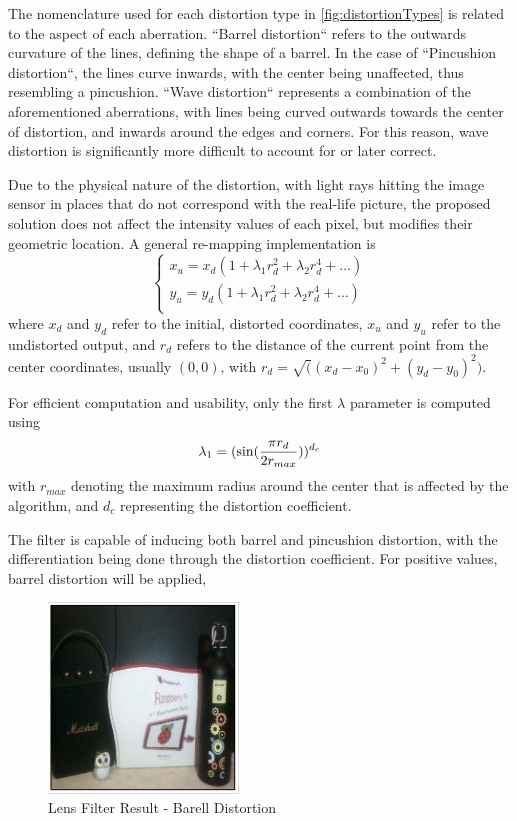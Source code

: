 The nomenclature used for each distortion type in \cref{fig:distortionTypes} is related to the aspect of each
aberration. ``Barrel distortion`` refers to the outwards curvature of the lines, defining the shape of a
barrel. In the case of ``Pincushion distortion``, the lines curve inwards, with the center being unaffected,
thus resembling a pincushion. ``Wave distortion`` represents a combination of the aforementioned aberrations,
with lines being curved outwards towards the center of distortion, and inwards around the edges and corners.
For this reason, wave distortion is significantly more difficult to account for or later correct.

Due to the physical nature of the distortion, with light rays hitting the image sensor in places that do not
correspond with the real-life picture, the proposed solution does not affect the intensity values of each
pixel, but modifies their geometric location. A general re-mapping implementation \cite{lensFromula} is
\begin{equation}
	\label{eq:lensFormula}
	\begin{cases}
		x_u = x_d(1 + \lambda_1r_d^2 + \lambda_2r_d^4 + \dots) \\
		y_u = y_d(1 + \lambda_1r_d^2 + \lambda_2r_d^4 + \dots) \\
	\end{cases}
\end{equation}
where \(x_d\) and \(y_d\) refer to the initial, distorted coordinates, \(x_u\) and \(y_u\) refer to the
undistorted output, and \(r_d\) refers to the distance of the current point from the center coordinates,
usually \((0, 0)\), with \(r_d = \sqrt((x_d - x_0)^2 + (y_d - y_0)^2)\).

For efficient computation and usability, only the first \(\lambda\) parameter is computed using \cite{lensStack}
\begin{equation}
	\label{eq:lensLambda}
	\lambda_1 = (\sin({{\pi r_d}\over{2 r_{max}}}))^{d_c}
\end{equation}
with \(r_{max}\) denoting the maximum radius around the center that is affected by the algorithm, and \(d_c\)
representing the distortion coefficient.

The filter is capable of inducing both barrel and pincushion distortion, with the differentiation being done
through the distortion coefficient. For positive values, barrel distortion will be applied,

\begin{figure}[H]
	\includegraphics[width=0.45\textwidth, height=0.45\textwidth]{resources/Lens_2.png}
	\caption{Lens Filter Result - Barell Distortion}
\end{figure}

